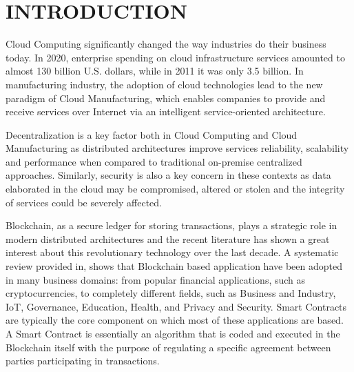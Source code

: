 \documentclass[10pt,a4paper]{report}
\begin{document}
\pagestyle{fancy}
\fancyhf{}


\newpage
{}
\renewcommand{\baselinestretch}{1.50}
\renewcommand{\headrulewidth}{1pt}
\renewcommand{\footrulewidth}{1pt}


\newpage

\setcounter{page}{2}


\renewcommand{\bibname}{References}

\chapter{	INTRODUCTION}
\thispagestyle{fancy}


\large\justify  Cloud Computing significantly changed the way industries do their business today. In 2020, enterprise spending on
cloud infrastructure services amounted to almost 130 billion
U.S. dollars, while in 2011 it was only 3.5 billion. In manufacturing industry, the adoption of cloud technologies lead to the
new paradigm of Cloud Manufacturing, which enables
companies to provide and receive services over Internet via
an intelligent service-oriented architecture.

\large\justify Decentralization is a key factor both in Cloud
Computing and Cloud Manufacturing as distributed architectures improve services reliability, scalability and performance when compared to traditional on-premise centralized
approaches. Similarly, security is also a key concern
in these contexts as data elaborated in the cloud may be
compromised, altered or stolen and the integrity of services
could be severely affected.

\large\justify Blockchain, as a secure ledger for storing transactions, plays a strategic role in modern distributed architectures and the recent literature has shown a great interest about this revolutionary technology over the last decade. A systematic review provided in, shows that Blockchain based application have been adopted in many business domains: from popular financial applications, such as cryptocurrencies, to completely different fields, such as Business and Industry, IoT, Governance, Education, Health, and Privacy and Security. Smart Contracts are typically the core component on which most of these applications are based. A Smart Contract is essentially an algorithm that is coded and executed in the Blockchain itself with the purpose of regulating a specific agreement between parties participating in transactions.
\end{document}
